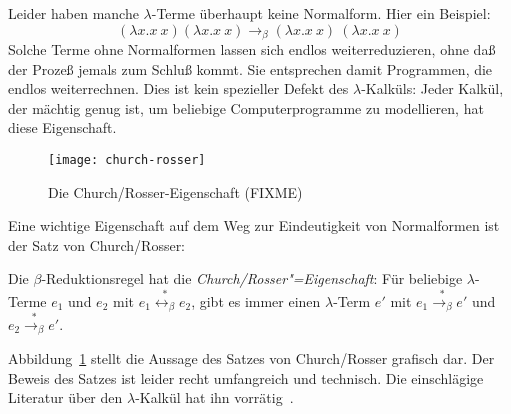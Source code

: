 Leider haben manche
$\lambda$-Terme überhaupt keine Normalform.  Hier ein
Beispiel:
%
\begin{displaymath}
  (\lambda x.x~x)(\lambda x.x~x) \rightarrow_\beta (\lambda x.x~x)~(\lambda x.x~x)
\end{displaymath}
%
Solche Terme ohne Normalformen lassen sich endlos weiterreduzieren,
ohne daß der Prozeß jemals zum Schluß kommt.  Sie entsprechen damit
Programmen, die endlos weiterrechnen.
Dies ist kein spezieller Defekt des
$\lambda$-Kalküls: Jeder Kalkül, der mächtig genug ist, um beliebige
Computerprogramme zu modellieren, hat diese Eigenschaft.

\begin{figure}[tb]
  \begin{center}
    {
      \texttt{[image: church-rosser]}
      }
    \caption{Die Church/Rosser-Eigenschaft (FIXME)}
    \label{fig:church-rosser}
  \end{center}
\end{figure}

Eine wichtige Eigenschaft auf dem Weg zur Eindeutigkeit von
Normalformen ist der Satz von Church/Rosser:
%
\begin{satz}
  \label{satz:church-rosser}
  Die $\beta$-Reduktionsregel hat die 
  \textit{Church/Rosser"=Eigenschaft}:  Für
  beliebige $\lambda$-Terme $e_1$ und  $e_2$ mit
  $e_1 \overset{\ast}{\leftrightarrow_\beta} e_2$,
  gibt es immer einen $\lambda$-Term $e'$ mit
  $e_1\overset{\ast}{\rightarrow_\beta} e'$ und
  $e_2\overset{\ast}{\rightarrow_\beta} e'$.
\end{satz}
%
Abbildung~\ref{fig:church-rosser} stellt die Aussage des Satzes von
Church/Rosser grafisch dar.
Der Beweis des Satzes ist leider recht umfangreich und technisch.
Die einschlägige Literatur über den $\lambda$-Kalkül hat ihn
vorrätig~\cite{HindleySeldin1986}.

